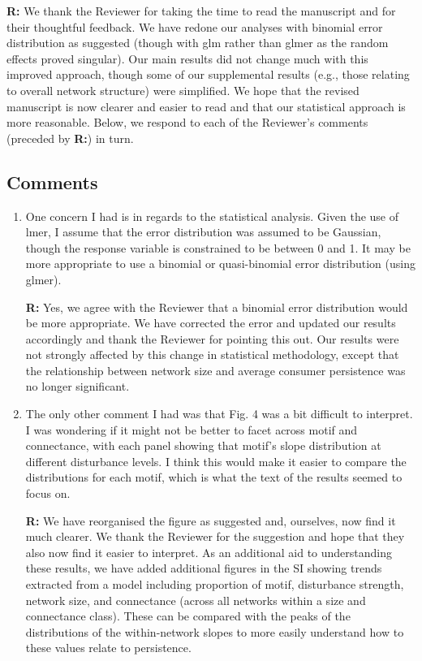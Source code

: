 \documentclass[12pt]{article}
\begin{document}
    \textbf{R:} We thank the Reviewer for taking the time to read the manuscript and for their thoughtful feedback. We have redone our analyses with binomial error distribution as suggested (though with glm rather than glmer as the random effects proved singular). Our main results did not change much with this improved approach, though some of our supplemental results (e.g., those relating to overall network structure) were simplified. We hope that the revised manuscript is now clearer and easier to read and that our statistical approach is more reasonable. Below, we respond to each of the Reviewer's comments (preceded by \textbf{R:}) in turn.

    \subsection*{Comments}

        \begin{enumerate}

            \item One concern I had is in regards to the statistical analysis. Given the use of lmer, I assume that the error distribution was assumed to be Gaussian, though the response variable is constrained to be between 0 and 1. It may be more appropriate to use a binomial or quasi-binomial error distribution (using glmer).

            \textbf{R:} Yes, we agree with the Reviewer that a binomial error distribution would be more appropriate. We have corrected the error and updated our results accordingly and thank the Reviewer for pointing this out. Our results were not strongly affected by this change in statistical methodology, except that the relationship between network size and average consumer persistence was no longer significant.

            \item The only other comment I had was that Fig. 4 was a bit difficult to interpret. I was wondering if it might not be better to facet across motif and connectance, with each panel showing that motif's slope distribution at different disturbance levels. I think this would make it easier to compare the distributions for each motif, which is what the text of the results seemed to focus on.

            \textbf{R:} We have reorganised the figure as suggested and, ourselves, now find it much clearer. We thank the Reviewer for the suggestion and hope that they also now find it easier to interpret. As an additional aid to understanding these results, we have added additional figures in the SI showing trends extracted from a model including proportion of motif, disturbance strength, network size, and connectance (across all networks within a size and connectance class). These can be compared with the peaks of the distributions of the within-network slopes to more easily understand how to these values relate to persistence.

        \end{enumerate}
\end{document}
